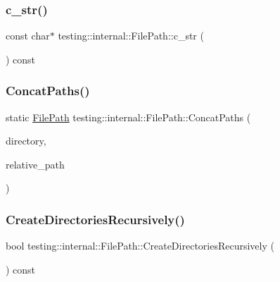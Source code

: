\subsubsection{\texorpdfstring{c\_str()}{c\_str()}}
{\footnotesize\ttfamily const char$\ast$ testing\+::internal\+::\+File\+Path\+::c\+\_\+str (\begin{DoxyParamCaption}{ }\end{DoxyParamCaption}) const\hspace{0.3cm}{\ttfamily [inline]}}

\mbox{\label{classtesting_1_1internal_1_1_file_path_ad58aa6d8b160d0ba0b661f56f0980e26}} 
\subsubsection{\texorpdfstring{ConcatPaths()}{ConcatPaths()}}
{\footnotesize\ttfamily static \mbox{\hyperlink{classtesting_1_1internal_1_1_file_path}{File\+Path}} testing\+::internal\+::\+File\+Path\+::\+Concat\+Paths (\begin{DoxyParamCaption}\item[{const \mbox{\hyperlink{classtesting_1_1internal_1_1_file_path}{File\+Path}} \&}]{directory,  }\item[{const \mbox{\hyperlink{classtesting_1_1internal_1_1_file_path}{File\+Path}} \&}]{relative\+\_\+path }\end{DoxyParamCaption})\hspace{0.3cm}{\ttfamily [static]}}

\mbox{\label{classtesting_1_1internal_1_1_file_path_a26790e530dd738f7fc8202c1ce718406}} 
\subsubsection{\texorpdfstring{CreateDirectoriesRecursively()}{CreateDirectoriesRecursively()}}
{\footnotesize\ttfamily bool testing\+::internal\+::\+File\+Path\+::\+Create\+Directories\+Recursively (\begin{DoxyParamCaption}{ }\end{DoxyParamCaption}) const}

